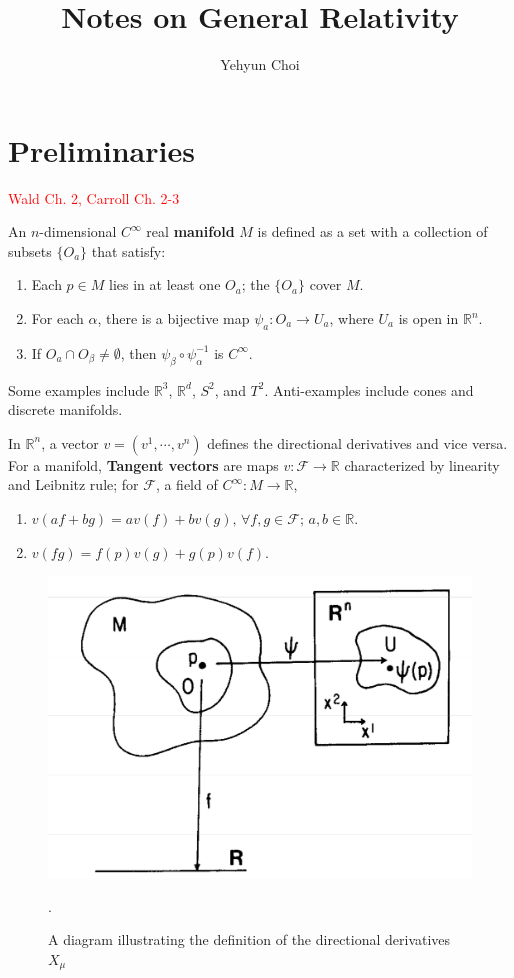 \documentclass{article}
\title{Notes on General Relativity}
\author{Yehyun Choi}
\begin{document}
\maketitle

\pagebreak

\section{Preliminaries}
\textcolor{red}{Wald Ch. 2, Carroll Ch. 2-3}

An $n$-dimensional $C^\infty$ real \textbf{manifold} $M$ is defined as a set with a collection of subsets $\{O_a\}$ that satisfy:
\begin{enumerate}
    \item Each $p\in M$ lies in at least one $O_a$; the $\{O_a\}$ cover $M$.
    \item For each $\alpha$, there is a bijective map $\psi_a:O_a\to U_a$, where $U_a$ is open in $\mathbb R^n$.
    \item If $O_a\cap O_\beta\ne\emptyset$, then $\psi_\beta\circ\psi_\alpha^{-1}$ is $C^\infty$.
\end{enumerate}
Some examples include $\mathbb R^3$, $\mathbb R^d$, $S^2$, and $T^2$. Anti-examples include cones and discrete manifolds.


In $\mathbb R^n$, a vector $v=(v^1,\cdots,v^n)$ defines the directional derivatives and vice versa. For a manifold, \textbf{Tangent vectors} are maps $v:\mathcal F\to\mathbb R$ characterized by linearity and Leibnitz rule; for $\mathcal F$, a field of $C^\infty:M\to\mathbb R$, 
\begin{enumerate}
    \item $v(af+bg)=av(f)+bv(g),\,\forall f,g\in\mathcal F;\,a,b\in\mathbb R$.
    \item $v(fg)=f(p)v(g)+g(p)v(f).$
\end{enumerate}

\begin{figure}[h]
    \centering
    \includegraphics[width=0.5\linewidth]{images/gr-images/5339.jpg}
    \caption{A diagram illustrating the definition of the directional derivatives $X_\mu$}.
    \label{fig:enter-label}
\end{figure}
\end{document}
